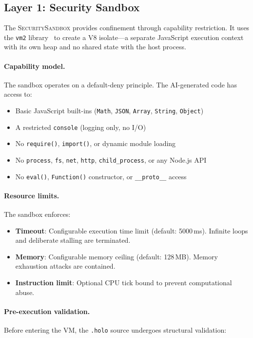 \documentclass[letterpaper,twocolumn,10pt]{article}
\newcommand{\sandbox}{\textsc{SecuritySandbox}} %
\begin{document}
\subsection{Layer 1: Security Sandbox}

The \sandbox{} provides confinement through capability restriction.
It uses the \texttt{vm2} library~\cite{nickel2020isolate} to create
a V8 isolate---a separate JavaScript execution context with its own
heap and no shared state with the host process.

\paragraph{Capability model.} The sandbox operates on a default-deny
principle. The AI-generated code has access to:

\begin{itemize}[leftmargin=*,topsep=2pt,itemsep=1pt]
  \item Basic JavaScript built-ins (\texttt{Math}, \texttt{JSON},
    \texttt{Array}, \texttt{String}, \texttt{Object})
  \item A restricted \texttt{console} (logging only, no I/O)
  \item No \texttt{require()}, \texttt{import()}, or dynamic module loading
  \item No \texttt{process}, \texttt{fs}, \texttt{net}, \texttt{http},
    \texttt{child\_process}, or any Node.js API
  \item No \texttt{eval()}, \texttt{Function()} constructor, or
    \texttt{\_\_proto\_\_} access
\end{itemize}

\paragraph{Resource limits.} The sandbox enforces:
\begin{itemize}[leftmargin=*,topsep=2pt,itemsep=1pt]
  \item \textbf{Timeout}: Configurable execution time limit
    (default: 5000\,ms). Infinite loops and deliberate stalling are
    terminated.
  \item \textbf{Memory}: Configurable memory ceiling (default: 128\,MB).
    Memory exhaustion attacks are contained.
  \item \textbf{Instruction limit}: Optional CPU tick bound to prevent
    computational abuse.
\end{itemize}

\paragraph{Pre-execution validation.} Before entering the VM, the
\texttt{.holo} source undergoes structural validation:
\end{document}

